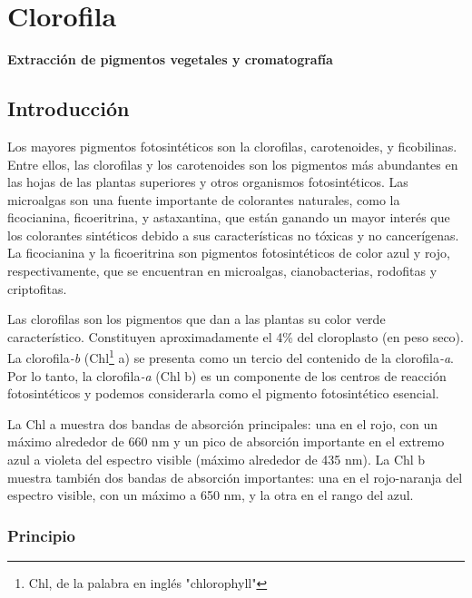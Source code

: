 \chapter[Extracci\'on de pigmentos vegetales y cromatograf\'ia]{Clorofila}

\begin{Huge}
	\begin{center}
		\textbf{Extracci\'on de pigmentos vegetales y cromatograf\'ia}
	\end{center}
\end{Huge}

\section{Introducci\'on}

Los mayores pigmentos fotosint\'eticos son la clorofilas, carotenoides, y ficobilinas. Entre ellos, las clorofilas y los carotenoides son los pigmentos m\'as abundantes en las hojas de las plantas superiores y otros organismos fotosint\'eticos. Las microalgas son una fuente importante de colorantes naturales, como la ficocianina, ficoeritrina, y astaxantina, que están ganando un mayor interés que los colorantes sintéticos debido a sus características no tóxicas y no cancerígenas. La ficocianina y la ficoeritrina son pigmentos fotosintéticos de color azul y rojo, respectivamente, que se encuentran en microalgas, cianobacterias, rodofitas y criptofitas.

Las clorofilas son los pigmentos que dan a las plantas su color verde caracter\'istico. Constituyen aproximadamente el 4\% del cloroplasto (en peso seco). La clorofila\textit{-b} (Chl\footnote{Chl, de la palabra en inglés "chlorophyll"} a) se presenta como un tercio del contenido de la clorofila\textit{-a}. Por lo tanto, la clorofila\textit{-a} (Chl b) es un componente de los centros de reacción fotosintéticos y podemos considerarla como el pigmento fotosintético esencial. 

La Chl a muestra dos bandas de absorción principales: una en el rojo, con un máximo alrededor de 660 nm y un pico de absorción importante en el extremo azul a violeta del espectro visible (máximo alrededor de 435 nm). La Chl b muestra también dos bandas de absorción importantes: una en el rojo-naranja del espectro visible, con un máximo a 650 nm, y la otra en el rango del azul.

\subsection{Principio}

